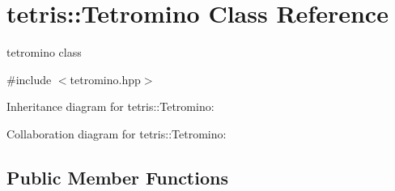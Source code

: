 \hypertarget{classtetris_1_1Tetromino}{}\section{tetris\+:\+:Tetromino Class Reference}
\label{classtetris_1_1Tetromino}


tetromino class  




{\ttfamily \#include $<$tetromino.\+hpp$>$}



Inheritance diagram for tetris\+:\+:Tetromino\+:


Collaboration diagram for tetris\+:\+:Tetromino\+:
\subsection*{Public Member Functions}
